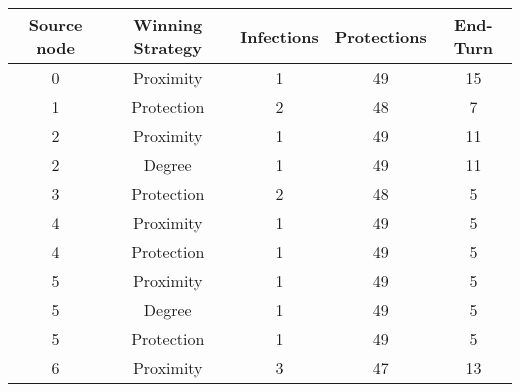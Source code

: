 \documentclass[results.tex]{subfiles}
\begin{document}
    \begin{center}
        \begin{tabular}{| c || c | c | c | c |}
            \hline
            {\bfseries Source node} & {\bfseries Winning Strategy} & {\bfseries Infections} & {\bfseries Protections}
            & {\bfseries End-Turn}
            \\  %
            \hline\hline
            0                       & Proximity                    & 1                      & 49                      & 15                   \\
            \hline
            1                       & Protection                   & 2                      & 48                      & 7                    \\
            \hline
            2                       & Proximity                    & 1                      & 49                      & 11                   \\
            \hline
            2                       & Degree                       & 1                      & 49                      & 11                   \\
            \hline
            3                       & Protection                   & 2                      & 48                      & 5                    \\
            \hline
            4                       & Proximity                    & 1                      & 49                      & 5                    \\
            \hline
            4                       & Protection                   & 1                      & 49                      & 5                    \\
            \hline
            5                       & Proximity                    & 1                      & 49                      & 5                    \\
            \hline
            5                       & Degree                       & 1                      & 49                      & 5                    \\
            \hline
            5                       & Protection                   & 1                      & 49                      & 5                    \\
            \hline
            6                       & Proximity                    & 3                      & 47                      & 13                   \\

\end{tabular}
\end{center}
\end{document}
